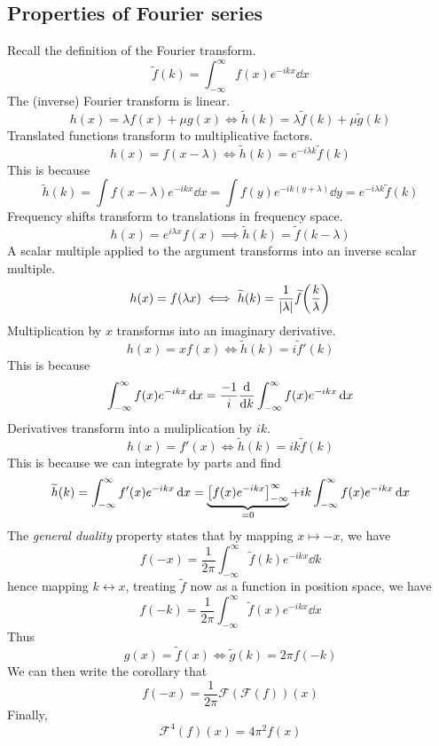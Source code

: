 \subsection{Properties of Fourier series}
Recall the definition of the Fourier transform.
\[
	\widetilde f(k) = \int_{-\infty}^\infty f(x) e^{-ikx} \dd{x}
\]
The (inverse) Fourier transform is linear.
\[
	h(x) = \lambda f(x) + \mu g(x) \iff \widetilde h(k) = \lambda \widetilde f(k) + \mu \widetilde g(k)
\]
Translated functions transform to multiplicative factors.
\[
	h(x) = f(x - \lambda) \iff \widetilde h(k) = e^{-i\lambda k} \widetilde f(k)
\]
This is because
\[
	\widetilde h(k) = \int f(x - \lambda) e^{-ikx} \dd{x} = \int f(y) e^{-ik(y + \lambda)} \dd{y} = e^{-i\lambda k} \widetilde f(k)
\]
Frequency shifts transform to translations in frequency space.
\[
	h(x) = e^{i\lambda x}f(x) \implies \widetilde h(k) = \widetilde f(k - \lambda)
\]
A scalar multiple applied to the argument transforms into an inverse scalar multiple.
\[
	h(x) = f(\lambda x) \iff \widetilde h(k) = \frac{1}{\abs{\lambda}} \widetilde f\qty(\frac{k}{\lambda})
\]
Multiplication by \( x \) transforms into an imaginary derivative.
\[
	h(x) = xf(x) \iff \widetilde h(k) = i\widetilde f'(k)
\]
This is because
\[
	\int_{-\infty}^\infty f(x) e^{-ikx} \dd{x} = \frac{-1}{i} \dv{k} \int_{-\infty}^\infty f(x) e^{-ikx} \dd{x}
\]
Derivatives transform into a muliplication by \( ik \).
\[
	h(x) = f'(x) \iff \widetilde h(k) = ik \widetilde f(k)
\]
This is because we can integrate by parts and find
\[
	\widetilde h(k) = \int_{-\infty}^\infty f'(x) e^{-ikx} \dd{x} = \underbrace{\qty[f(x) e^{-ikx}]_{-\infty}^\infty}_{=0} + ik\int_{-\infty}^\infty f(x) e^{-ikx} \dd{x}
\]
The \textit{general duality} property states that by mapping \( x \mapsto -x \), we have
\[
	f(-x) = \frac{1}{2\pi} \int_{-\infty}^\infty \widetilde f(k) e^{-ikx} \dd{k}
\]
hence mapping \( k \leftrightarrow x \), treating \( \widetilde f \) now as a function in position space, we have
\[
	f(-k) = \frac{1}{2\pi} \int_{-\infty}^\infty \widetilde f(x) e^{-ikx} \dd{x}
\]
Thus
\[
	g(x) = \widetilde f(x) \iff \widetilde g(k) = 2\pi f(-k)
\]
We can then write the corollary that
\[
	f(-x) = \frac{1}{2\pi} \mathcal F(\mathcal F(f))(x)
\]
Finally,
\[
	\mathcal F^4(f)(x) = 4\pi^2 f(x)
\]
